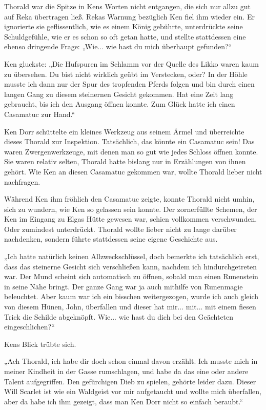 \documentclass[10pt, a4paper, oneside]{book}
\begin{document}
Thorald war die Spitze in Kens Worten nicht entgangen, die sich nur allzu gut auf Reka übertragen ließ. Rekas Warnung bezüglich Ken fiel ihm wieder ein. Er ignorierte sie geflissentlich, wie es einem König gebührte, unterdrückte seine Schuldgefühle, wie er es schon so oft getan hatte, und stellte stattdessen eine ebenso dringende Frage: „Wie... wie hast du mich überhaupt gefunden?“

Ken gluckste: „Die Hufspuren im Schlamm vor der Quelle des Likko waren kaum zu übersehen. Du bist nicht wirklich geübt im Verstecken, oder? In der Höhle musste ich dann nur der Spur des tropfenden Pferds folgen und bin durch einen langen Gang zu diesem steinernen Gesicht gekommen. Hat eine Zeit lang gebraucht, bis ich den Ausgang öffnen konnte. Zum Glück hatte ich einen Casamatuc zur Hand.“

Ken Dorr schüttelte ein kleines Werkzeug aus seinem Ärmel und überreichte dieses Thorald zur Inspektion. Tatsächlich, das könnte ein Casamatuc sein! Das waren Zwergenwerkzeuge, mit denen man so gut wie jedes Schloss öffnen konnte. Sie waren relativ selten, Thorald hatte bislang nur in Erzählungen von ihnen gehört. Wie Ken an diesen Casamatuc gekommen war, wollte Thorald lieber nicht nachfragen.

Während Ken ihm fröhlich den Casamatuc zeigte, konnte Thorald nicht umhin, sich zu wundern, wie Ken so gelassen sein konnte. Der zornerfüllte Schemen, der Ken im Eingang zu Elgas Hütte gewesen war, schien vollkommen verschwunden. Oder zumindest unterdrückt. Thorald wollte lieber nicht zu lange darüber nachdenken, sondern führte stattdessen seine eigene Geschichte aus.

„Ich hatte natürlich keinen Allzweckschlüssel, doch bemerkte ich tatsächlich erst, dass das steinerne Gesicht sich verschließen kann, nachdem ich hindurchgetreten war. Der Mund scheint sich automatisch zu öffnen, sobald man einen Runenstein in seine Nähe bringt. Der ganze Gang war ja auch mithilfe von Runenmagie beleuchtet. Aber kaum war ich ein bisschen weitergezogen, wurde ich auch gleich von diesem Hünen, John, überfallen und dieser hat mir... mit... mit einem fiesen Trick die Schilde abgeknöpft. Wie... wie hast du dich bei den Geächteten eingeschlichen?“

Kens Blick trübte sich.

„Ach Thorald, ich habe dir doch schon einmal davon erzählt. Ich musste mich in meiner Kindheit in der Gasse rumschlagen, und habe da das eine oder andere Talent aufgegriffen. Den gefürchigen Dieb zu spielen, gehörte leider dazu. Dieser Will Scarlet ist wie ein Waldgeist vor mir aufgetaucht und wollte mich überfallen, aber da habe ich ihm gezeigt, dass man Ken Dorr nicht so einfach beraubt.“
\end{document}
